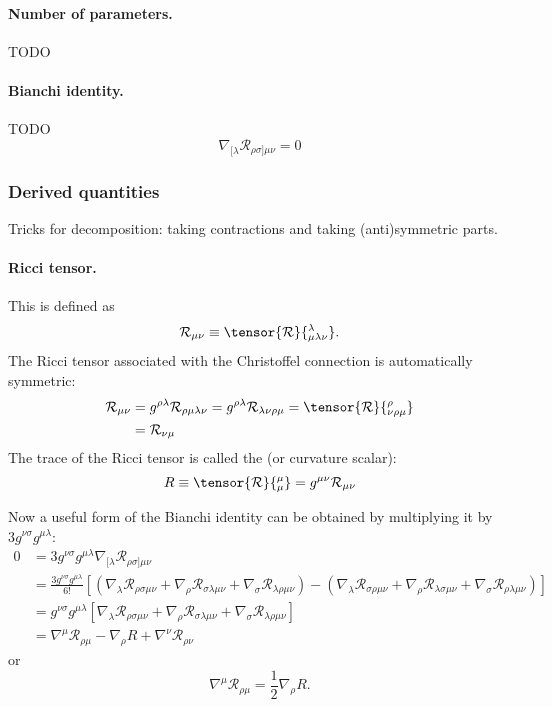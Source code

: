 \paragraph{Number of parameters.} TODO
\paragraph{Bianchi identity.} TODO
\[ \nabla_{[\lambda}\mathcal{R}_{\rho\sigma]\mu\nu} = 0 \]

\subsubsection{Derived quantities}
Tricks for decomposition: taking contractions and taking (anti)symmetric parts.

\paragraph{Ricci tensor.} This  is defined as
\[ \mathcal{R}_{\mu\nu} \equiv \tensor{\mathcal{R}}{^\lambda_{\mu\lambda\nu}}. \]
The Ricci tensor associated with the Christoffel connection is automatically symmetric:
\begin{align*}
\mathcal{R}_{\mu\nu} &= g^{\rho\lambda}\mathcal{R}_{\rho\mu\lambda\nu} = g^{\rho\lambda}\mathcal{R}_{\lambda\nu\rho\mu} = \tensor{\mathcal{R}}{^\rho_{\nu\rho\mu}} \\
&= \mathcal{R}_{\nu\mu}
\end{align*}
The trace of the Ricci tensor is called the  (or curvature scalar):
\[ R \equiv \tensor{\mathcal{R}}{^\mu_\mu} = g^{\mu\nu}\mathcal{R}_{\mu\nu} \]

Now a useful form of the Bianchi identity can be obtained by multiplying it by $3g^{\nu\sigma}g^{\mu\lambda}$:
\begin{align*}
0 &= 3g^{\nu\sigma}g^{\mu\lambda}\nabla_{[\lambda}\mathcal{R}_{\rho\sigma]\mu\nu} \\
&= \frac{3g^{\nu\sigma}g^{\mu\lambda}}{6!}\left[\left(\nabla_{\lambda}\mathcal{R}_{\rho\sigma\mu\nu} + \nabla_{\rho}\mathcal{R}_{\sigma\lambda\mu\nu} + \nabla_{\sigma}\mathcal{R}_{\lambda\rho\mu\nu}\right) - \left(\nabla_{\lambda}\mathcal{R}_{\sigma\rho\mu\nu} + \nabla_{\rho}\mathcal{R}_{\lambda\sigma\mu\nu} + \nabla_{\sigma}\mathcal{R}_{\rho\lambda\mu\nu}\right)\right] \\
&= g^{\nu\sigma}g^{\mu\lambda}\left[\nabla_{\lambda}\mathcal{R}_{\rho\sigma\mu\nu} + \nabla_{\rho}\mathcal{R}_{\sigma\lambda\mu\nu} + \nabla_{\sigma}\mathcal{R}_{\lambda\rho\mu\nu}\right] \\
&= \nabla^\mu\mathcal{R}_{\rho\mu} - \nabla_\rho R + \nabla^\nu\mathcal{R}_{\rho\nu}
\end{align*}
or
\[ \boxed{\nabla^\mu\mathcal{R}_{\rho\mu} = \frac{1}{2}\nabla_\rho R.} \]


